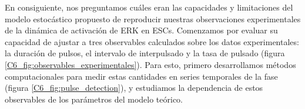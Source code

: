 \documentclass[./main.tex]{subfiles}
\begin{document}



En consiguiente, nos preguntamos cuáles eran las capacidades y limitaciones del modelo estocástico propuesto de reproducir nuestras observaciones experimentales de la dinámica de activación de ERK en ESCs. Comenzamos por evaluar su capacidad de ajustar a tres observables calculados sobre los datos experimentales: la duración de pulsos, el intervalo de interpulsado y la tasa de pulsado (figura \ref{C6_fig:observables_experimentales}). Para esto, primero desarrollamos métodos computacionales para medir estas cantidades en series temporales de la fase (figura \ref{C6_fig:pulse_detection}), y estudiamos la dependencia de estos observables de los parámetros del modelo teórico. 
\end{document}
